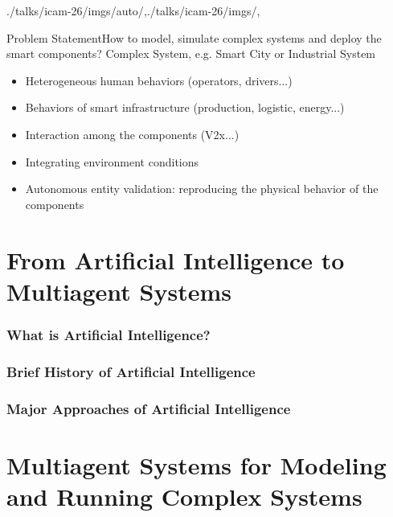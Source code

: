 \localized

\begin{bibliographysection}
\begin{graphicspathcontext}{{./talks/icam-26/imgs/auto/},{./talks/icam-26/imgs/},\old}

\begin{righttitleframe}{Problem Statement}{How to model, simulate complex systems and deploy the smart components?}
	{\larger Complex System, e.g. Smart City or Industrial System}
	\begin{itemize}
		\item Heterogeneous human behaviors (operators, drivers...)
		\item Behaviors of smart infrastructure (production, logistic, energy...)
		\item Interaction among the components (V2x...)
		\item Integrating environment conditions
		\item Autonomous entity validation: reproducing the physical behavior of the components
	\end{itemize}
\end{righttitleframe}

\tableofcontentslide[onlyparts]

\part{From Artificial Intelligence to Multiagent Systems}

\section{What is Artificial Intelligence?}
\localized

\section{Brief History of Artificial Intelligence}
\localized

\section{Major Approaches of Artificial Intelligence}
\localized
\localized

\part{Multiagent Systems for Modeling and Running Complex Systems}


\end{graphicspathcontext}
\end{bibliographysection}
